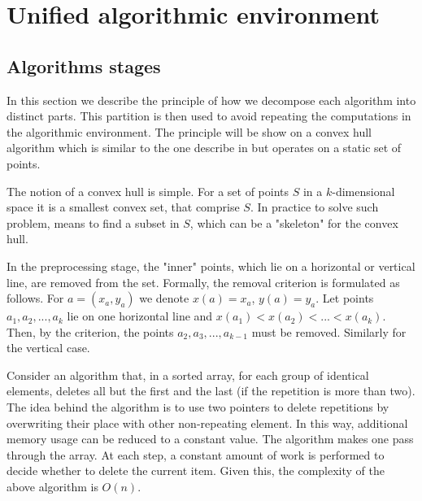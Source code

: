 \documentclass[conference]{IEEEtran}
\theoremstyle{plane}
\begin{document}
\section{Unified algorithmic environment}
\subsection{Algorithms stages}



		In this section we describe the principle of how we decompose each algorithm into distinct parts. This partition is then used to avoid repeating the computations in the algorithmic environment. The principle will be show on a convex hull algorithm which is similar to the one describe in \cite{overmars} but operates on a static set of points.
		
		The notion of a convex hull is simple. For a set of points $S$ in a $k$-dimensional space it is a smallest convex set, that comprise $S$. In practice to solve such problem, means to find a subset in $S$, which can be a "skeleton" for the convex hull.


		In the preprocessing stage, the "inner" points, which lie on a horizontal or vertical line, are removed from the set. Formally, the removal criterion is formulated as follows. For $a = (x_a, y_a)$ we denote $x(a)=x_a$, $y(a)=y_a$. Let points $a_1, a_2, ..., a_k$ lie on one horizontal line and $x(a_1) < x(a_2) <... <x (a_k) $. Then, by the criterion, the points $a_2, a_3, ..., a_{k-1}$ must be removed. Similarly for the vertical case.
		
		Consider an algorithm that, in a sorted array, for each group of identical elements, deletes all but the first and the last (if the repetition is more than two). The idea behind the algorithm is to use two pointers to delete repetitions by overwriting their place with other non-repeating element. In this way, additional memory usage can be reduced to a constant value. The algorithm makes one pass through the array. At each step, a constant amount of work is performed to decide whether to delete the current item. Given this, the complexity of the above algorithm is $O(n)$.
		
\end{document}
